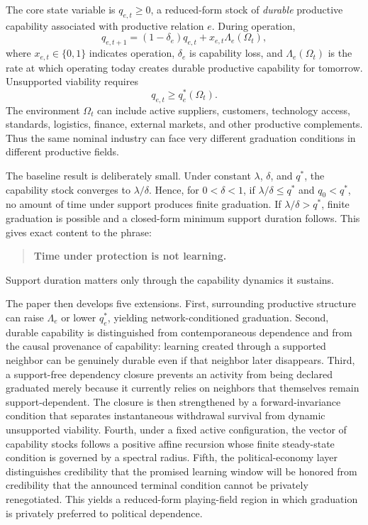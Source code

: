 The core state variable is $q_{e,t}\ge0$, a reduced-form stock of \emph{durable} productive capability associated with productive relation $e$. During operation,
\begin{equation}
q_{e,t+1}
=
(1-\delta_e)q_{e,t}
+x_{e,t}\Lambda_e(\Omega_t),
\label{eq:capability-law}
\end{equation}
where $x_{e,t}\in\{0,1\}$ indicates operation, $\delta_e$ is capability loss, and $\Lambda_e(\Omega_t)$ is the rate at which operating today creates durable productive capability for tomorrow. Unsupported viability requires
\begin{equation}
q_{e,t}\ge q_e^*(\Omega_t).
\label{eq:unsupported-threshold}
\end{equation}
The environment $\Omega_t$ can include active suppliers, customers, technology access, standards, logistics, finance, external markets, and other productive complements. Thus the same nominal industry can face very different graduation conditions in different productive fields.

The baseline result is deliberately small. Under constant $\lambda$, $\delta$, and $q^*$, the capability stock converges to $\lambda/\delta$. Hence, for $0<\delta<1$, if $\lambda/\delta\le q^*$ and $q_0<q^*$, no amount of time under support produces finite graduation. If $\lambda/\delta>q^*$, finite graduation is possible and a closed-form minimum support duration follows. This gives exact content to the phrase:
\begin{quote}
\textbf{Time under protection is not learning.}
\end{quote}
Support duration matters only through the capability dynamics it sustains.

The paper then develops five extensions. First, surrounding productive structure can raise $\Lambda_e$ or lower $q_e^*$, yielding network-conditioned graduation. Second, durable capability is distinguished from contemporaneous dependence and from the causal provenance of capability: learning created through a supported neighbor can be genuinely durable even if that neighbor later disappears. Third, a support-free dependency closure prevents an activity from being declared graduated merely because it currently relies on neighbors that themselves remain support-dependent. The closure is then strengthened by a forward-invariance condition that separates instantaneous withdrawal survival from dynamic unsupported viability. Fourth, under a fixed active configuration, the vector of capability stocks follows a positive affine recursion whose finite steady-state condition is governed by a spectral radius. Fifth, the political-economy layer distinguishes credibility that the promised learning window will be honored from credibility that the announced terminal condition cannot be privately renegotiated. This yields a reduced-form playing-field region in which graduation is privately preferred to political dependence.

